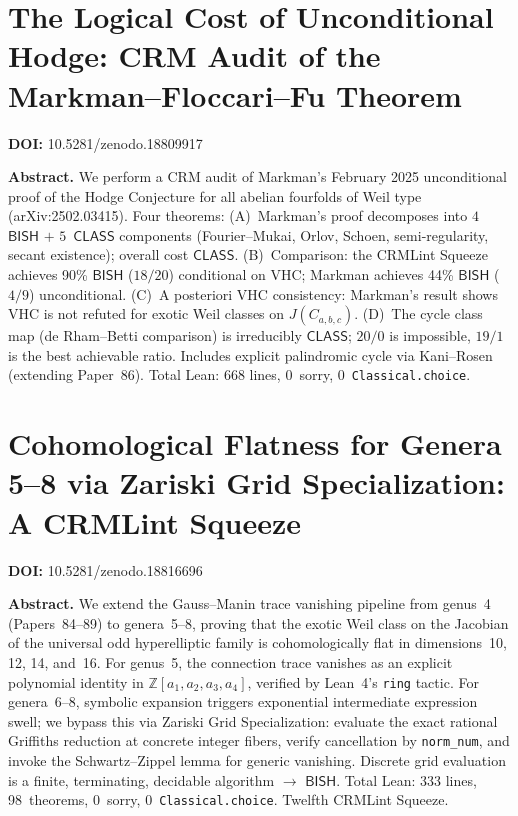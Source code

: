 \documentclass[11pt,a4paper]{article}
\begin{document}
\newpage

\section{The Logical Cost of Unconditional Hodge: CRM Audit of the Markman--Floccari--Fu Theorem}
\label{sec:p91}
\textbf{DOI:} 10.5281/zenodo.18809917

\bigskip
\noindent\textbf{Abstract.}
We perform a CRM audit of Markman's February 2025 unconditional proof of the Hodge Conjecture for all abelian fourfolds of Weil type (arXiv:2502.03415). Four theorems: (A)~Markman's proof decomposes into $4$~$\mathsf{BISH}$ $+$ $5$~$\mathsf{CLASS}$ components (Fourier--Mukai, Orlov, Schoen, semi-regularity, secant existence); overall cost $\mathsf{CLASS}$. (B)~Comparison: the CRMLint Squeeze achieves 90\% $\mathsf{BISH}$ ($18/20$) conditional on VHC; Markman achieves 44\% $\mathsf{BISH}$ ($4/9$) unconditional. (C)~A posteriori VHC consistency: Markman's result shows VHC is not refuted for exotic Weil classes on $J(C_{a,b,c})$. (D)~The cycle class map (de Rham--Betti comparison) is irreducibly $\mathsf{CLASS}$; $20/0$ is impossible, $19/1$ is the best achievable ratio. Includes explicit palindromic cycle via Kani--Rosen (extending Paper~86). Total Lean: 668 lines, 0~sorry, 0~\texttt{Classical.choice}.

\section{Cohomological Flatness for Genera 5--8 via Zariski Grid Specialization: A CRMLint Squeeze}
\label{sec:p92}
\textbf{DOI:} 10.5281/zenodo.18816696

\bigskip
\noindent\textbf{Abstract.}
We extend the Gauss--Manin trace vanishing pipeline from genus~4 (Papers~84--89) to genera~5--8, proving that the exotic Weil class on the Jacobian of the universal odd hyperelliptic family is cohomologically flat in dimensions~10, 12, 14, and~16. For genus~5, the connection trace vanishes as an explicit polynomial identity in $\mathbb{Z}[a_1,a_2,a_3,a_4]$, verified by Lean~4's \texttt{ring} tactic. For genera~6--8, symbolic expansion triggers exponential intermediate expression swell; we bypass this via Zariski Grid Specialization: evaluate the exact rational Griffiths reduction at concrete integer fibers, verify cancellation by \texttt{norm\_num}, and invoke the Schwartz--Zippel lemma for generic vanishing. Discrete grid evaluation is a finite, terminating, decidable algorithm $\to$ $\mathsf{BISH}$. Total Lean: 333 lines, 98~theorems, 0~sorry, 0~\texttt{Classical.choice}. Twelfth CRMLint Squeeze.
\end{document}
